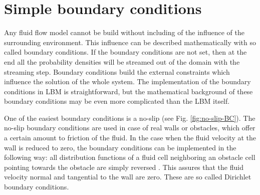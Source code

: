 
\section{Simple boundary conditions}

Any fluid flow model cannot be build without including of the influence of the surrounding environment. This influence can be described mathematically with so called boundary conditions. If the boundary conditions are not set, then at the end all the probability densities will be streamed out of the domain with the streaming step. Boundary conditions build the external constraints which influence the solution of the whole system. The implementation of the boundary conditions in LBM is straightforward, but the mathematical background of these boundary conditions may be even more complicated than the LBM itself.

One of the easiest boundary conditions is a no-slip (see Fig. \ref{fig:no-slip-BC}). The no-slip boundary conditions are used in case of real walls or obstacles, which offer a certain amount to friction of the fluid. In the case when the fluid velocity at the wall is reduced to zero, the boundary conditions can be implemented in the following way: all distribution functions of a fluid cell neighboring an obstacle cell pointing towards the obstacle are simply reversed \cite{pflaum}. This assures that the fluid velocity normal and tangential to the wall are zero. These are so called Dirichlet boundary conditions.

